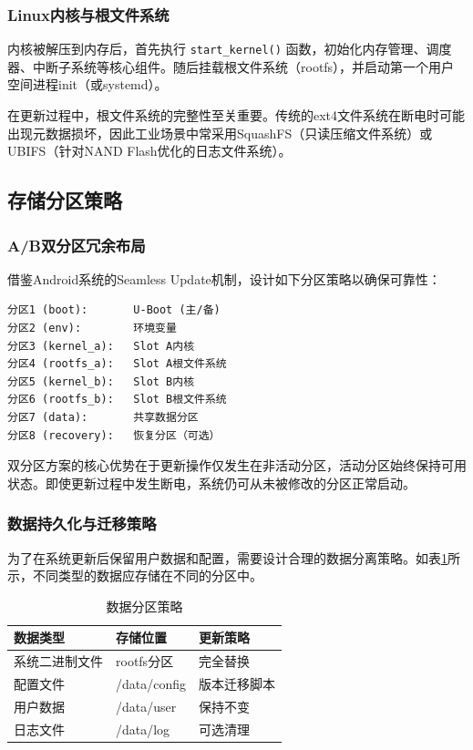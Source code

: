 \documentclass[a4paper,12pt]{article}
\begin{document}
\subsubsection{Linux内核与根文件系统}
内核被解压到内存后，首先执行 \texttt{start\_kernel()} 函数，初始化内存管理、调度器、中断子系统等核心组件。随后挂载根文件系统（rootfs），并启动第一个用户空间进程init（或systemd）。

在更新过程中，根文件系统的完整性至关重要。传统的ext4文件系统在断电时可能出现元数据损坏，因此工业场景中常采用SquashFS（只读压缩文件系统）或UBIFS（针对NAND Flash优化的日志文件系统）。

\subsection{存储分区策略}

\subsubsection{A/B双分区冗余布局}
借鉴Android系统的Seamless Update机制，设计如下分区策略以确保可靠性：
\begin{lstlisting}[caption={工业级双分区布局}]
分区1 (boot):       U-Boot (主/备)
分区2 (env):        环境变量
分区3 (kernel_a):   Slot A内核
分区4 (rootfs_a):   Slot A根文件系统
分区5 (kernel_b):   Slot B内核
分区6 (rootfs_b):   Slot B根文件系统
分区7 (data):       共享数据分区
分区8 (recovery):   恢复分区（可选）
\end{lstlisting}

双分区方案的核心优势在于更新操作仅发生在非活动分区，活动分区始终保持可用状态。即使更新过程中发生断电，系统仍可从未被修改的分区正常启动。

\subsubsection{数据持久化与迁移策略}
为了在系统更新后保留用户数据和配置，需要设计合理的数据分离策略。如表\ref{tab:data_partition}所示，不同类型的数据应存储在不同的分区中。

\begin{table}[H]
\centering
\caption{数据分区策略}
\label{tab:data_partition}
\begin{tabular}{lll}
\toprule
\textbf{数据类型} & \textbf{存储位置} & \textbf{更新策略} \\
\midrule
系统二进制文件 & rootfs分区 & 完全替换 \\
配置文件 & /data/config & 版本迁移脚本 \\
用户数据 & /data/user & 保持不变 \\
日志文件 & /data/log & 可选清理 \\
\bottomrule
\end{tabular}
\end{table}
\end{document}
